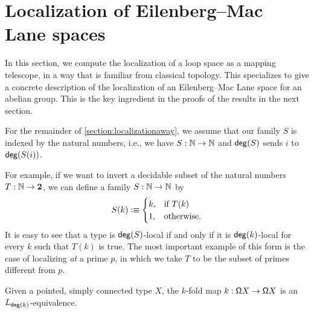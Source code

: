 \section{Localization of Eilenberg--Mac Lane spaces}\label{ss:localizingKgn}

In this section, we compute the localization of a loop space as a mapping telescope,
in a way that is familiar from classical topology.
This specializes to give a concrete description of the
localization of an Eilenberg--Mac Lane space for an abelian group.
This is the key ingredient in the proofs of the results in the next section.

For the remainder of \cref{section:localizationaway}, we assume that our family
$S$ is indexed by the natural numbers, i.e., we have $S : \mathbb{N} \to \mathbb{N}$ and
$\mathsf{deg}(S)$ sends $i$ to $\mathsf{deg}(S(i))$.

For example, if we want to invert a decidable subset of the natural numbers
$T : \mathbb{N} \to \mathbf{2}$, we can define a family $S : \mathbb{N} \to \mathbb{N}$ by
\[
    S(k) \vcentcolon\equiv \begin{cases} k, & \text{if $T(k)$} \\
                              1, & \text{otherwise.}
                \end{cases}
\]
It is easy to see that a type is $\mathsf{deg}(S)$-local if and only if it is $\mathsf{deg}(k)$-local for every $k$ such that $T(k)$ is true.
The most important example of this form is the case of localizing \emph{at} a prime $p$,
in which we take $T$ to be the subset of primes different from $p$.

\begin{lem}\label{lemma:pmapisorthogonal}
    Given a pointed, simply connected type $X$, the $k$-fold map $k : \mathsf{\Omega} X \to \mathsf{\Omega} X$
    is an $L_{\mathsf{deg}(k)}$-equivalence.
\end{lem}

